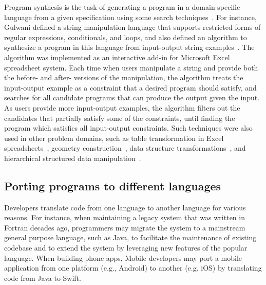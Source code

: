 \documentclass[runningheads,a4paper]{llncs}
\begin{document}
Program synthesis is the task of generating a program in a domain-specific language from a given specification using some search techniques~\cite{Gul2010}. For instance, Gulwani defined a string manipulation language that supports restricted forms of regular expressions, conditionals, and loops, and also defined an algorithm to synthesize a program in this language from input-output string examples~\cite{Gul2011}. The algorithm was implemented as an interactive add-in for Microsoft Excel spreadsheet system. Each time when users manipulate a string and provide both the before- and after- versions of the manipulation, the algorithm treats the input-output example as a constraint that a desired program should satisfy, and searches for all candidate programs that can produce the output given the input. As users provide more input-output examples, the algorithm filters out the candidates that partially satisfy some of the constraints, until finding the program which satisfies all input-output constraints. Such techniques were also used in other problem domains, such as table transformation in Excel spreadsheets~\cite{HaG2011}, geometry construction~\cite{GKT2011}, data structure transformations~\cite{Feser:2015}, and hierarchical structured data manipulation~\cite{Yaghmazadeh:2016}.

\subsection{Porting programs to different languages} 

Developers translate code from one language to another language for various reasons. For instance, when maintaining a legacy system that was written in Fortran decades ago, programmers may migrate the system to a mainstream general purpose language, such as Java, to facilitate the maintenance of existing codebase and to extend the system by leveraging new features of the popular language. When building phone apps, Mobile developers may port a mobile application from one platform (e.g., Android) to another (e.g. iOS) by translating code from Java to Swift. 
\end{document}
